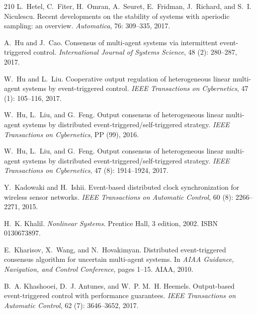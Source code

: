 \documentclass{autart}
\begin{document}
{\begin{thebibliography}{210}
L.~Hetel, C.~Fiter, H.~Omran, A.~Seuret, E.~Fridman, J.~Richard, and S.~I.
  Niculescu.
\newblock Recent developments on the stability of systems with aperiodic
  sampling: an overview.
\newblock \emph{Automatica}, 76: 309--335, 2017.

A.~Hu and J.~Cao.
\newblock Consensus of multi-agent systems via intermittent event-triggered
  control.
\newblock \emph{International Journal of Systems Science}, 48
  (2): 280--287, 2017.

W.~Hu and L.~Liu.
\newblock Cooperative output regulation of heterogeneous linear multi-agent
  systems by event-triggered control.
\newblock \emph{IEEE Transactions on Cybernetics}, 47 (1):
  105--116, 2017.

W.~Hu, L.~Liu, and G.~Feng.
\newblock Output consensus of heterogeneous linear multi-agent systems by
  distributed event-triggered/self-triggered strategy.
\newblock \emph{IEEE Transactions on Cybernetics}, PP (99), 2016.

W.~Hu, L.~Liu, and G.~Feng.
\newblock Output consensus of heterogeneous linear multi-agent systems by
  distributed event-triggered/self-triggered strategy.
\newblock \emph{IEEE Transactions on Cybernetics}, 47 (8):
  1914--1924, 2017.

Y.~Kadowaki and H.~Ishii.
\newblock Event-based distributed clock synchronization for wireless sensor
  networks.
\newblock \emph{IEEE Transactions on Automatic Control}, 60
  (8): 2266--2271, 2015.

H.~K. Khalil.
\newblock \emph{Nonlinear Systems}.
\newblock Prentice Hall, 3 edition, 2002.
\newblock ISBN 0130673897.

E.~Kharisov, X.~Wang, and N.~Hovakimyan.
\newblock Distributed event-triggered consensus algorithm for uncertain
  multi-agent systems.
\newblock In \emph{AIAA Guidance, Navigation, and Control Conference}, pages
  1--15. AIAA, 2010.

B.~A. Khashooei, D.~J. Antunes, and W.~P. M.~H. Heemels.
\newblock Output-based event-triggered control with performance guarantees.
\newblock \emph{IEEE Transactions on Automatic Control}, 62
  (7): 3646--3652, 2017.


\end{thebibliography}}
\end{document}
